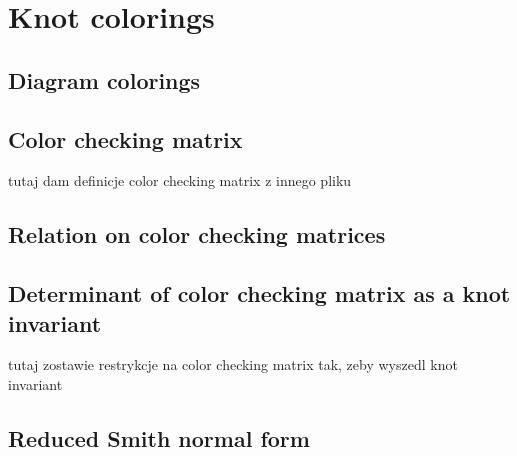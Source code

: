 \section{Knot colorings}

\subsection{Diagram colorings}



\subsection{Color checking matrix}

{\large\color{red}
tutaj dam definicje color checking matrix z innego pliku
}



\subsection{Relation on color checking matrices}



\subsection{Determinant of color checking matrix as a knot invariant}

{\large\color{red}
  tutaj zostawie restrykcje na color checking matrix tak, zeby wyszedl knot invariant
}

 

\subsection{Reduced Smith normal form}

 
